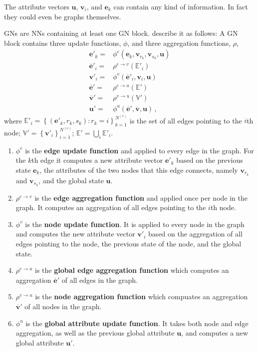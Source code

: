 The attribute vectors $\bm{u}$, $\bm{v}_i$, and $\bm{e}_k$ can contain any kind of information. In fact they could even be graphs themselves.

GNs are NNs containing at least one GN block. \citeauthor{deepmind:graphnets} describe it as follows: A GN block contains three update functions, $\phi$, and three aggregation functions, $\rho$,
\begin{align}
    \bm{e}'_k=&\phi^e\left(\bm{e}_k,\bm{v}_{r_k},\bm{v}_{s_k},\bm{u}\right)\\
    \bm{\overline{e}}'_i=&\rho^{e\rightarrow v}\left(\mathbb{E}'_i\right)\\
    \bm{v}'_i=&\phi^v\left(\bm{\overline{e}}'_i,\bm{v}_i,\bm{u}\right)\\
    \bm{\overline{e}}'=&\rho^{e\rightarrow u}\left(\mathbb{E}'\right)\\
    \bm{\overline{v}}'=&\rho^{v\rightarrow u}\left(\mathbb{V}'\right)\\
    \bm{u}'=&\phi^u\left(\bm{\overline{e}}',\bm{\overline{v}},\bm{u}\right)\,,
\end{align}
where $\mathbb{E}'_i=\left\{\left(\bm{e}'_k,r_k,s_k\right):r_k=i\right\}_{k=1}^{N^{(e)}}$ is the set of all edges pointing to the $i$th node; $\mathbb{V}'=\left\{\bm{v}'_i\right\}_{i=1}^{N^{(v)}}$; $\mathbb{E}'=\bigcup_i\mathbb{E}'_i$.

\begin{enumerate}
    \item $\phi^e$ is the \textbf{edge update function} and applied to every edge in the graph. For the $k$th edge it computes a new attribute vector $\bm{e}'_k$ based on the previous state $\bm{e}_k$, the attributes of the two nodes that this edge connects, namely $\bm{v}_{r_k}$ and $\bm{v}_{s_k}$, and the global state $\bm{u}$.
    \item $\rho^{e\rightarrow v}$ is the \textbf{edge aggregation function} and applied once per node in the graph. It computes an aggregation of all edges pointing to the $i$th node.
    \item $\phi^v$ is the \textbf{node update function}. It is applied to every node in the graph and computes the new attribute vector $\bm{v}'_i$ based on the aggregation of all edges pointing to the node, the previous state of the node, and the global state.
    \item $\rho^{e\rightarrow u}$ is the \textbf{global edge aggregation function} which computes an aggregation $\bm{\overline{e}}'$ of all edges in the graph.
    \item $\rho^{v\rightarrow u}$ is the \textbf{node aggregation function} which compuates an aggregation $\bm{\overline{v}}'$ of all nodes in the graph.
    \item $\phi^u$ is the \textbf{global attribute update function}. It takes both node and edge aggregation, as well as the previous global attribute $\bm{u}$, and computes a new global attribute $\bm{u}'$.
\end{enumerate}

